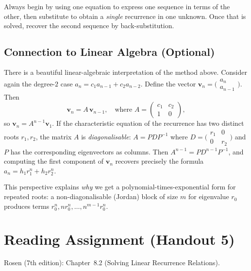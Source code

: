 \documentclass[11pt, a4paper, notitlepage]{report}
\theoremstyle{definition}
\theoremstyle{remark}
\begin{document}
\begin{examtip}[title={Solving Simultaneous Recurrences}]
Always begin by using one equation to express one sequence in terms of the other, then
substitute to obtain a \emph{single} recurrence in one unknown.  Once that is solved, recover
the second sequence by back-substitution.
\end{examtip}

\subsection{Connection to Linear Algebra (Optional)}
\label{subsec:linalg-connection}

There is a beautiful linear-algebraic interpretation of the method above.  Consider again
the degree-$2$ case $a_n = c_1 a_{n-1} + c_2 a_{n-2}$.  Define the vector
$\mathbf{v}_n = \bigl(\begin{smallmatrix} a_n \\ a_{n-1} \end{smallmatrix}\bigr)$.  Then
\[
  \mathbf{v}_n = A\,\mathbf{v}_{n-1}, \quad \text{where } A = \begin{pmatrix} c_1 & c_2 \\ 1 & 0 \end{pmatrix},
\]
so $\mathbf{v}_n = A^{n-1}\mathbf{v}_1$.  If the characteristic equation of the recurrence
has two distinct roots $r_1, r_2$, the matrix $A$ is \emph{diagonalisable}: $A = PDP^{-1}$
where $D = \bigl(\begin{smallmatrix} r_1 & 0 \\ 0 & r_2 \end{smallmatrix}\bigr)$ and
$P$ has the corresponding eigenvectors as columns.  Then $A^{n-1} = PD^{n-1}P^{-1}$, and
computing the first component of $\mathbf{v}_n$ recovers precisely the formula
$a_n = h_1 r_1^n + h_2 r_2^n$.

This perspective explains \emph{why} we get a polynomial-times-exponential form for repeated
roots: a non-diagonalisable (Jordan) block of size $m$ for eigenvalue $r_0$ produces terms
$r_0^n, n r_0^n, \ldots, n^{m-1} r_0^n$.

\section*{Reading Assignment (Handout 5)}
Rosen (7th edition): Chapter~8.2 (Solving Linear Recurrence Relations).
\end{document}
